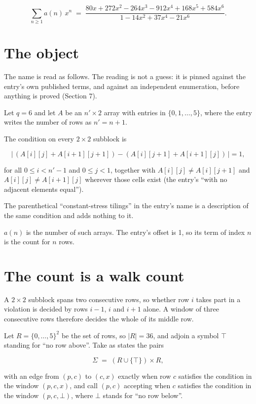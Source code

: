 \documentclass[11pt]{article}
\theoremstyle{definition}
\begin{document}
\[\sum_{n \ge 1} a(n)\,x^n \;=\; \frac{80x + 272x^{2} - 264x^{3} - 912x^{4} + 168x^{5} + 584x^{6}}{1 - 14x^{2} + 37x^{4} - 21x^{6}}.\]

\section{The object}

The name is read as follows. The reading is not a guess: it is pinned against the entry's own published terms, and against an independent enumeration, before anything is proved (Section 7).

Let $q = 6$ and let $A$ be an $n' \times 2$ array with entries in $\{0,1,\dots,5\}$, where the entry writes the number of rows as $n' = n + 1$.

The condition on every $2 \times 2$ subblock is

\[\bigl|\,(A[i][j] + A[i{+}1][j{+}1]) - (A[i][j{+}1] + A[i{+}1][j])\,\bigr| = 1,\]

for all $0 \le i < n'-1$ and $0 \le j < 1$, together with $A[i][j] \ne A[i][j{+}1]$ and $A[i][j] \ne A[i{+}1][j]$ wherever those cells exist (the entry's ``with no adjacent elements equal'').

The parenthetical ``constant-stress tilings'' in the entry's name is a description of the same condition and adds nothing to it.

$a(n)$ is the number of such arrays. The entry's offset is 1, so its term of index $n$ is the count for $n$ rows.

\section{The count is a walk count}

A $2 \times 2$ subblock spans two consecutive rows, so whether row $i$ takes part in a violation is decided by rows $i-1$, $i$ and $i+1$ alone. A window of three consecutive rows therefore decides the whole of its middle row.

Let $R = \{0,\dots,5\}^{2}$ be the set of rows, so $|R| = 36$, and adjoin a symbol $\top$ standing for ``no row above''. Take as states the pairs

\[\Sigma \;=\; (R \cup \{\top\}) \times R,\]

with an edge from $(p,c)$ to $(c,x)$ exactly when row $c$ satisfies the condition in the window $(p,c,x)$, and call $(p,c)$ accepting when $c$ satisfies the condition in the window $(p,c,\bot)$, where $\bot$ stands for ``no row below''.
\end{document}
